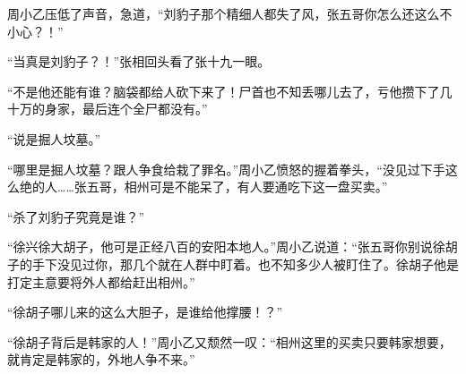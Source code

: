 周小乙压低了声音，急道，“刘豹子那个精细人都失了风，张五哥你怎么还这么不小心？！”

“当真是刘豹子？！”张相回头看了张十九一眼。

“不是他还能有谁？脑袋都给人砍下来了！尸首也不知丢哪儿去了，亏他攒下了几十万的身家，最后连个全尸都没有。”

“说是掘人坟墓。”

“哪里是掘人坟墓？跟人争食给栽了罪名。”周小乙愤怒的握着拳头，“没见过下手这么绝的人……张五哥，相州可是不能呆了，有人要通吃下这一盘买卖。”

“杀了刘豹子究竟是谁？”

“徐兴徐大胡子，他可是正经八百的安阳本地人。”周小乙说道：“张五哥你别说徐胡子的手下没见过你，那几个就在人群中盯着。也不知多少人被盯住了。徐胡子他是打定主意要将外人都给赶出相州。”

“徐胡子哪儿来的这么大胆子，是谁给他撑腰！？”

“徐胡子背后是韩家的人！”周小乙又颓然一叹：“相州这里的买卖只要韩家想要，就肯定是韩家的，外地人争不来。”

